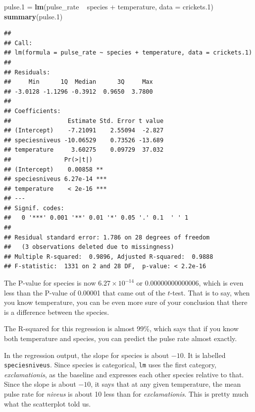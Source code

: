 \documentclass[]{tufte-book}
\newenvironment{Shaded}{}{}
\newcommand{\DataTypeTok}[1]{\textcolor[rgb]{0.56,0.13,0.00}{#1}}
\newcommand{\FloatTok}[1]{\textcolor[rgb]{0.25,0.63,0.44}{#1}}
\newcommand{\KeywordTok}[1]{\textcolor[rgb]{0.00,0.44,0.13}{\textbf{#1}}}
\newcommand{\NormalTok}[1]{#1}
\newcommand{\OperatorTok}[1]{\textcolor[rgb]{0.40,0.40,0.40}{#1}}
\newcommand{\StringTok}[1]{\textcolor[rgb]{0.25,0.44,0.63}{#1}}
\theoremstyle{definition}
\theoremstyle{definition}
\theoremstyle{definition}
\theoremstyle{remark}
\begin{document}
\begin{Shaded}
\begin{Highlighting}[]
\NormalTok{pulse}\FloatTok{.1}\NormalTok{ =}\StringTok{ }\KeywordTok{lm}\NormalTok{(pulse_rate }\OperatorTok{~}\StringTok{ }\NormalTok{species }\OperatorTok{+}\StringTok{ }\NormalTok{temperature, }
    \DataTypeTok{data =}\NormalTok{ crickets}\FloatTok{.1}\NormalTok{)}
\KeywordTok{summary}\NormalTok{(pulse}\FloatTok{.1}\NormalTok{)}
\end{Highlighting}
\end{Shaded}

\begin{verbatim}
## 
## Call:
## lm(formula = pulse_rate ~ species + temperature, data = crickets.1)
## 
## Residuals:
##     Min      1Q  Median      3Q     Max 
## -3.0128 -1.1296 -0.3912  0.9650  3.7800 
## 
## Coefficients:
##                Estimate Std. Error t value
## (Intercept)    -7.21091    2.55094  -2.827
## speciesniveus -10.06529    0.73526 -13.689
## temperature     3.60275    0.09729  37.032
##               Pr(>|t|)    
## (Intercept)    0.00858 ** 
## speciesniveus 6.27e-14 ***
## temperature    < 2e-16 ***
## ---
## Signif. codes:  
##   0 '***' 0.001 '**' 0.01 '*' 0.05 '.' 0.1  ' ' 1
## 
## Residual standard error: 1.786 on 28 degrees of freedom
##   (3 observations deleted due to missingness)
## Multiple R-squared:  0.9896, Adjusted R-squared:  0.9888 
## F-statistic:  1331 on 2 and 28 DF,  p-value: < 2.2e-16
\end{verbatim}

The P-value for species is now \(6.27\times 10^{-14}\) or
0.00000000000006, which is even less than the P-value of 0.00001 that
came out of the \(t\)-test. That is to say, when you know temperature,
you can be even more sure of your conclusion that there is a difference
between the species.

The R-squared for this regression is almost 99\%, which says that if you
know both temperature and species, you can predict the pulse rate almost
exactly.

In the regression output, the slope for species is about \(-10\). It is
labelled \texttt{speciesniveus}. Since species is categorical,
\texttt{lm} uses the first category, \emph{exclamationis}, as the
baseline and expresses each other species relative to that. Since the
slope is about \(-10\), it says that at any given temperature, the mean
pulse rate for \emph{niveus} is about 10 less than for
\emph{exclamationis}. This is pretty much what the scatterplot told us.
\end{document}
